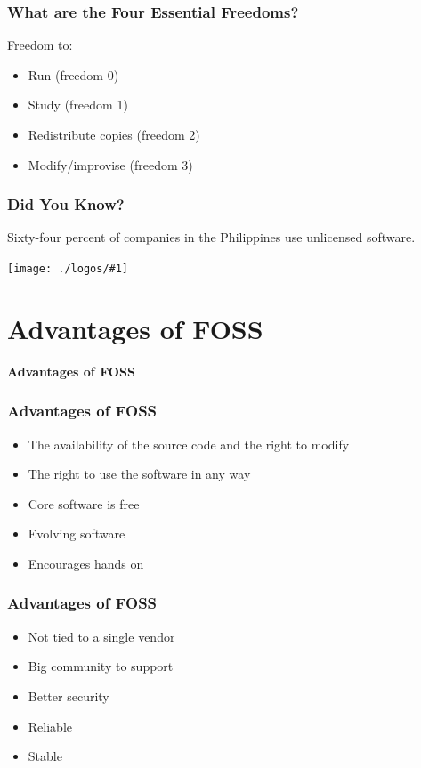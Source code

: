 \documentclass[17pt]{beamer}
\newcommand{\fullpic}[1]{\begin{frame}
\texttt{[image: ./logos/\#1]}
\end{frame}
}
\newcommand{\trivia}[1]{\begin{frame}
		\frametitle{Did You Know?}
		\begin{center}
			#1
		\end{center}
	\end{frame}
}
\begin{document}
	\begin{frame}
		\frametitle{What are the Four Essential Freedoms?}
		Freedom to:
		\begin{itemize}
			\item<1-> Run (freedom 0)
			\item<2-> Study (freedom 1)
			\item<3-> Redistribute copies (freedom 2)
			\item<4-> Modify/improvise (freedom 3)
		\end{itemize}		
	\end{frame}

	\trivia{Sixty-four percent of companies in the Philippines use unlicensed software.}
	
	\fullpic{64percentuseunlicensed.png}

	\section{Advantages of FOSS}
	\begin{frame}
		\begin{center}
			\textbf{\LARGE Advantages of FOSS}
		\end{center} 
	\end{frame}

	\begin{frame}
		\frametitle{Advantages of FOSS}
		\begin{itemize}
			\item<1-> The availability of the source code and the right to modify
			\item<2-> The right to use the software in any way
			\item<3-> Core software is free
			\item<4-> Evolving software
			\item<5-> Encourages hands on
		\end{itemize}		
	\end{frame}

	\begin{frame}
		\frametitle{Advantages of FOSS}
		\begin{itemize}
			\item<1-> Not tied to a single vendor
			\item<2-> Big community to support
			\item<3-> Better security
			\item<4-> Reliable
			\item<5-> Stable
		\end{itemize}		
	\end{frame}
\end{document}
